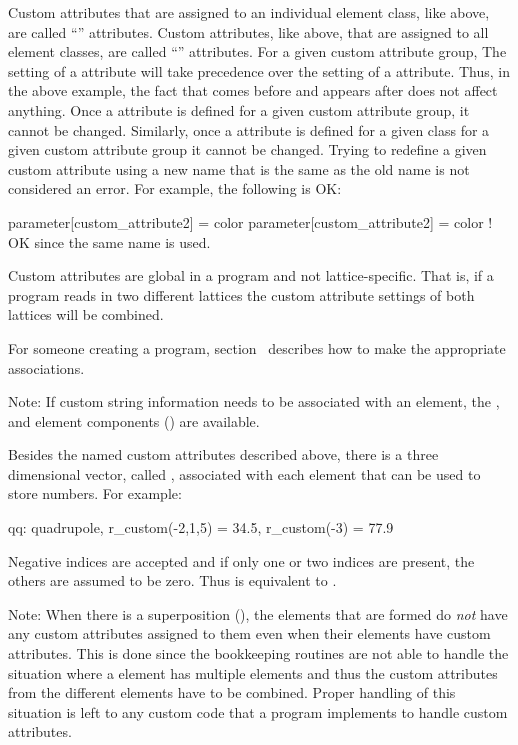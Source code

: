 {{{{{Custom attributes that are assigned to an individual element class, like  above, are
called ``'' attributes. Custom attributes, like  above, that are
assigned to all element classes, are called ``'' attributes. For a given custom attribute
group, The setting of a  attribute will take precedence over the setting of a
 attribute. Thus, in the above example, the fact that  comes
before  and  appears after does not affect anything. Once a
 attribute is defined for a given custom attribute group, it cannot be
changed. Similarly, once a  attribute is defined for a given class for a given
custom attribute group it cannot be changed. Trying to redefine a given custom attribute using a 
new name that is the same as the old name is not considered an error. For example, the following is OK:
\begin{example}
  parameter[custom_attribute2] = color
  parameter[custom_attribute2] = color   ! OK since the same name is used.
\end{example}

Custom attributes are global in a program and not lattice-specific. That is, if a program reads in two
different lattices the custom attribute settings of both lattices will be combined.

For someone creating a program, section~ describes how to make the appropriate
associations.

Note: If custom string information needs to be associated with an element, the , 
and  element components () are available.

Besides the named custom attributes described above, there is a three dimensional vector, called
, associated with each element that can be used to store numbers.  
For example:
\begin{example}
  qq: quadrupole, r_custom(-2,1,5) = 34.5, r_custom(-3) = 77.9
\end{example}
Negative indices are accepted and if only one or two indices are present, the others
are assumed to be zero. Thus  is equivalent to .

Note: When there is a superposition (), the  elements that are formed
do {\em not} have any custom attributes assigned to them even when their  elements
have custom attributes. This is done since the \bmad bookkeeping routines are not able to handle the
situation where a  element has multiple  elements and thus the custom
attributes from the different  elements have to be combined. Proper handling of this
situation is left to any custom code that a program implements to handle custom attributes.

}}}}}
